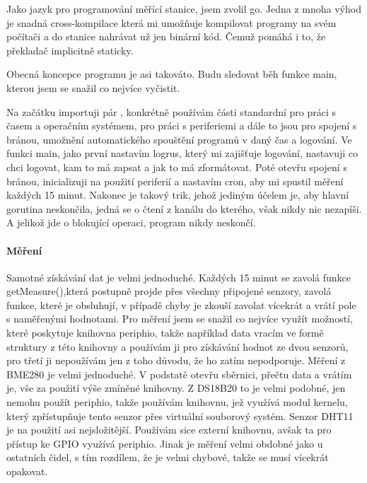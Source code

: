 Jako jazyk pro programování měřící stanice, jsem zvolil \gls{go}. Jedna z mnoha výhod je snadná \gls{cross-kompilace} 
která mi umožňuje kompilovat programy na svém počítači a do stanice nahrávat už jen binární kód. Čemuž pomáhá i to, že 
překladač implicitně  staticky.

Obecná koncepce programu je asi takováto. Budu sledovat běh funkce main, kterou jsem se snažil co nejvíce vyčistit.

Na začátku importuji pár , konkrétně používám části standardní  
pro práci s časem a operačním systémem,  pro práci s periferiemi a dále to jsou 
 pro spojení s bránou, umožnění automatického spouštění programů v daný čas a logování. Ve 
funkci main, jako první nastavím logrus, který mi zajišťuje logování, nastavuji co chci 
logovat, kam to má zapsat a jak to má zformátovat. Poté otevřu spojení s bránou, inicializuji 
 na použití periferií a nastavím cron, aby mi spustil měření každých 15 minut. Nakonec je 
takový trik, jehož jediným účelem je, aby hlavní gorutina neskončila, jedná se o čtení z kanálu do kterého, však nikdy 
nic nezapíši. A jelikož jde o blokující operaci, program nikdy neskončí.

\paragraph*{Měření}
Samotné získávání dat je velmi jednoduché. Každých 15 minut se zavolá funkce getMeasure(),která postupně projde přes 
všechny připojené senzory, zavolá funkce, které je obsluhují, v případě chyby je zkouší zavolat vícekrát a vrátí pole 
s naměřenými hodnotami. Pro měření jsem se snažil co nejvíce využít možností, které poskytuje  \gls{knihovna} 
\gls{periphio}, takže například data vracím ve formě struktury z této knihovny a používám ji pro získávání hodnot ze 
dvou senzorů, pro třetí ji nepoužívám jen z toho důvodu, že ho zatím nepodporuje. Měření z BME280 je velmi jednoduché. 
V podstatě otevřu sběrnici, přečtu data a vrátím je, vše za použití výše zmíněné knihovny. Z DS18B20 to je velmi podobné, 
jen nemohu použít \gls{periphio}, takže používám knihovnu, jež využívá modul kernelu, který zpřístupňuje tento senzor 
přes virtuální souborový systém. Senzor DHT11 je na použití asi nejsložitější. Používám sice externí knihovnu, avšak ta 
pro přístup ke GPIO využívá \gls{periphio}. Jinak je měření velmi obdobné jako u ostatních čidel, s tím rozdílem, že je 
velmi chybové, takže se musí vícekrát opakovat.

